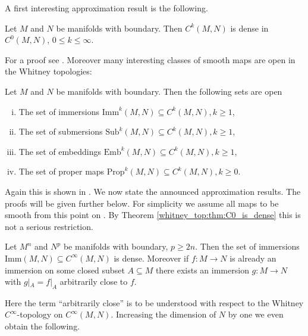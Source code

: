 A first interesting approximation result is the following.

\begin{theorem}
    \label{whitney_top:thm:C0_is_dense}
    Let $M$ and $N$ be manifolds with boundary. Then $C^k(M,N)$ is dense in $C^0(M,N)$, $0\leq k \leq \infty$.
\end{theorem}

For a proof see \cite{hirsch2012differential}. Moreover many interesting classes of smooth maps are open in the Whitney topologies:

\begin{theorem}
    \label{whitney_top:thm:open_sets}
    Let $M$ and $N$ be manifolds with boundary. Then the following sets are open
    \begin{enumerate}[(i)]
        \item The set of immersions $\mathrm{Imm}^k(M,N) \subseteq C^k(M,N), k \geq 1$,
        \item The set of submersions $\mathrm{Sub}^k(M,N) \subseteq C^k(M,N), k \geq 1$,
        \item The set of embeddings $\mathrm{Emb}^k(M,N) \subseteq C^k(M,N), k \geq 1$,
        \item The set of proper maps $\mathrm{Prop}^k(M,N) \subseteq C^k(M,N), k \geq 0$.
    \end{enumerate}
\end{theorem}

Again this is shown in \cite{hirsch2012differential}. We now state the announced approximation results. The proofs will be given further below. For simplicity we assume all maps to be smooth from this point on \footnotemark. By Theorem \ref{whitney_top:thm:C0_is_dense} this is not a serious restriction. 


\begin{theorem}[Immersions]
    \label{whitney_top:thm:approx_immersions}
    Let $M^n$ and $N^p$ be manifolds with boundary, $p \geq 2n$. Then the set of immersions $\mathrm{Imm}(M,N) \subseteq C^\infty(M,N)$ is dense. Moreover if $f \colon M \to N$ is already an immersion on some closed subset $A \subseteq M$ there exists an immersion $g \colon M \to N$ with $g|_A = f|_A$ arbitrarily close to $f$.
\end{theorem}

Here the term ``arbitrarily close'' is to be understood with respect to the Whitney $C^\infty$-topology on $C^\infty(M,N)$. Increasing the dimension of $N$ by one we even obtain the following.

